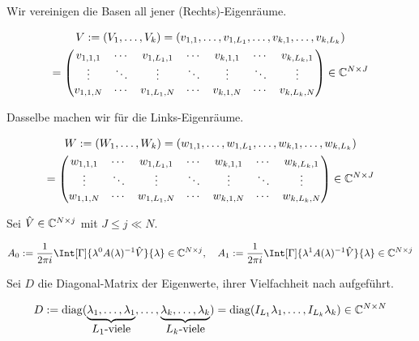 Wir vereinigen die Basen all jener (Rechts)-Eigenräume.

\begin{multline*}
    V
    :=
    (V_1, \dots, V_k)
    =
    (v_{1, 1}, \dots, v_{1, L_1}, \dots, v_{k, 1}, \dots, v_{k, L_k}) \\
    =
    \begin{pmatrix}
        v_{1, 1, 1} & \cdots & v_{1, L_1, 1} & \cdots & v_{k, 1, 1} & \cdots & v_{k, L_k, 1} \\
        \vdots      & \ddots & \vdots        & \ddots & \vdots      & \ddots & \vdots        \\
        v_{1, 1, N} & \cdots & v_{1, L_1, N} & \cdots & v_{k, 1, N} & \cdots & v_{k, L_k, N}
    \end{pmatrix}
    \in
    \mathbb{C}^{N \times J}
\end{multline*}

Dasselbe machen wir für die Links-Eigenräume.

\begin{multline*}
    W
    :=
    (W_1, \dots, W_k)
    =
    (w_{1, 1}, \dots, w_{1, L_1}, \dots, w_{k, 1}, \dots, w_{k, L_k}) \\
    =
    \begin{pmatrix}
        w_{1, 1, 1} & \cdots & w_{1, L_1, 1} & \cdots & w_{k, 1, 1} & \cdots & w_{k, L_k, 1} \\
        \vdots      & \ddots & \vdots        & \ddots & \vdots      & \ddots & \vdots        \\
        w_{1, 1, N} & \cdots & w_{1, L_1, N} & \cdots & w_{k, 1, N} & \cdots & w_{k, L_k, N}
    \end{pmatrix}
    \in
    \mathbb{C}^{N \times J}
\end{multline*}

Sei $\hat V \in \mathbb{C}^{N \times j}$ mit $J \leq j \ll N$.

\begin{align} \label{eq:integral_matrizen}
    A_0 := \frac{1}{2 \pi i} \Int[\Gamma]{\lambda^0 A(\lambda)^{-1} \hat V}{\lambda} \in \C^{N \times j},
    \quad
    A_1 := \frac{1}{2 \pi i} \Int[\Gamma]{\lambda^1 A(\lambda)^{-1} \hat V}{\lambda} \in \C^{N \times j}
\end{align}

Sei $D$ die Diagonal-Matrix der Eigenwerte, ihrer Vielfachheit nach aufgeführt.

\begin{align} \label{eq:diagonal_matrix}
    D
    :=
    \operatorname{diag}
    (
        \underbrace
        {
            \lambda_1, \dots, \lambda_1
        }_{
            \displaystyle
            \text{$L_1$-viele}
        },
        \dots,
        \underbrace
        {
            \lambda_k, \dots, \lambda_k
        }_{
            \displaystyle
            \text{$L_k$-viele}
        }
    )
    =
    \operatorname{diag}(I_{L_1} \lambda_1, \dots, I_{L_k} \lambda_k)
    \in
    \mathbb{C}^{N \times N}
\end{align}

